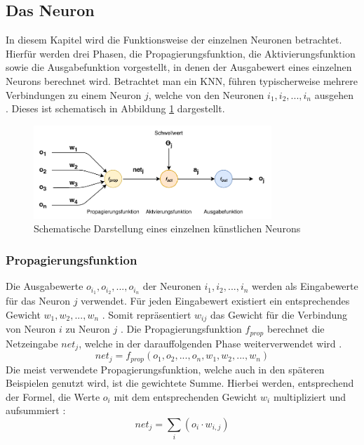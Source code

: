 \subsection{Das Neuron}
\label{subsec:neuron}
In diesem Kapitel wird die Funktionsweise der einzelnen Neuronen betrachtet. Hierfür werden drei Phasen, die Propagierungsfunktion, die Aktivierungsfunktion sowie die Ausgabefunktion vorgestellt, in denen der Ausgabewert eines einzelnen Neurons berechnet wird. Betrachtet man ein \ac{KNN}, führen typischerweise mehrere Verbindungen zu einem Neuron $j$, welche von den Neuronen $i_1, i_2, ..., i_n$ ausgehen \cite{kriesel2008kleiner}. Dieses ist schematisch in Abbildung \ref{fig:neuron_overview} dargestellt.
\begin{figure}[h]
	\centering
	\includegraphics[width=0.8\textwidth]{./img/neural_network_basics/neuron_overview.pdf} 
	\caption{Schematische Darstellung eines einzelnen künstlichen Neurons}
	\label{fig:neuron_overview}
\end{figure}

\subsubsection{Propagierungsfunktion} 
Die Ausgabewerte $o_{i_1}, o_{i_2}, ..., o_{i_n}$ der Neuronen $i_1, i_2, ..., i_n$ werden als Eingabewerte für das Neuron $j$ verwendet. Für jeden Eingabewert existiert ein entsprechendes Gewicht $w_1, w_2, ..., w_n$ \cite{kriesel2008kleiner}. Somit repräsentiert $w_{ij}$ das Gewicht für die Verbindung von Neuron $i$ zu Neuron $j$ \cite{zell2003simulation}. Die Propagierungsfunktion $f_{prop}$ berechnet die Netzeingabe $net_j$, welche in der darauffolgenden Phase weiterverwendet wird \cite{kriesel2008kleiner}. 
$$net_j=f_{prop}(o_1, o_2, ..., o_n, w_1, w_2, ..., w_n)$$
Die meist verwendete Propagierungsfunktion, welche auch in den späteren Beispielen genutzt wird, ist die gewichtete Summe. Hierbei werden, entsprechend der Formel, die Werte $o_i$ mit dem entsprechenden Gewicht $w_i$ multipliziert und aufsummiert \cite{kriesel2008kleiner}:
$$net_j=\sum_{i}(o_{i} \cdot w_{i, j})$$

